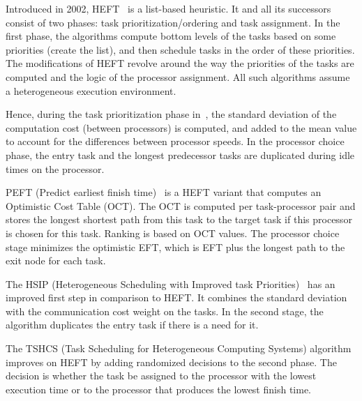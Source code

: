 \documentclass[conference]{IEEEtran}
\newcommand{\hmey}[1]{{\color{red}[HM: #1]}}
\begin{document}
    Introduced in 2002, HEFT~\cite{topcuoglu2002performance} is a list-based heuristic.
    It and all its successors consist of two phases: task prioritization/ordering and task assignment.
    In the first phase, the algorithms compute bottom levels of the tasks based on some priorities (create the list),
    and then schedule tasks in the order of these priorities.
    The modifications of HEFT revolve around the way the priorities of the tasks are computed and the logic of the processor assignment.
    All such algorithms assume a heterogeneous execution environment.

    Hence, during the task prioritization phase in~\cite{sulaiman2021hybrid},  the standard deviation of the computation cost
    (between processors) is computed, and added to the mean value to account for the differences between processor speeds.
    In the processor choice phase, the entry task and the longest predecessor tasks are duplicated 
    during idle times on the processor.


    PEFT (Predict earliest finish time)~\cite{arabnejad2014list} is a HEFT variant that computes an Optimistic
    Cost Table (OCT).
    The OCT is computed per task-processor pair and stores the longest shortest path from this task to the target task if this
    processor is chosen for this task.
    Ranking is based on OCT values.
    The processor choice stage minimizes the optimistic EFT, which is EFT plus the longest path to the exit node for each task.

    The HSIP (Heterogeneous Scheduling with Improved task Priorities)~\cite{wang2016hsip} has an improved first step in
    comparison to HEFT.
    It combines the standard deviation with the communication cost weight on the tasks.
    In the second stage, the algorithm duplicates the entry task if there is a need for it.

    The TSHCS (Task Scheduling for Heterogeneous Computing Systems) algorithm~\cite{alebrahim2017task} improves on HEFT
    by adding randomized decisions to the second phase.
    The decision is whether the task be assigned to the processor with the lowest execution time or to the processor that
    produces the lowest finish time.
\end{document}
